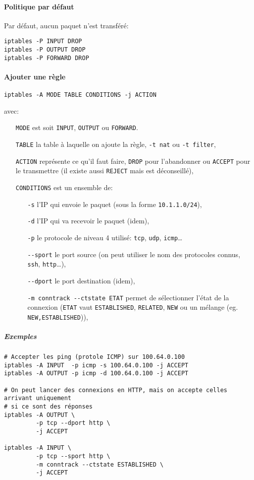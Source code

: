 \documentclass[10pt,a4paper,french]{article}
\begin{document}
\paragraph{Politique par défaut}
Par défaut, aucun paquet n'est transféré:
\begin{verbatim}
iptables -P INPUT DROP
iptables -P OUTPUT DROP
iptables -P FORWARD DROP
\end{verbatim}

\paragraph{Ajouter une règle}
\begin{verbatim}
iptables -A MODE TABLE CONDITIONS -j ACTION
\end{verbatim}
avec:
\begin{itemize}
\item[\tt MODE] est soit {\tt INPUT}, {\tt OUTPUT} ou {\tt FORWARD}.
\item[\tt TABLE] la table à laquelle on ajoute la règle, {\tt -t nat} ou {\tt -t filter},
\item[\tt ACTION] représente ce qu'il faut faire, {\tt DROP} pour l'abandonner ou {\tt ACCEPT} pour le transmettre (il existe aussi {\tt REJECT} mais est déconseillé),
\item[\tt CONDITIONS] est un ensemble de:
\begin{itemize}
\item[\tt -s] l'IP qui envoie le paquet (sous la forme {\tt 10.1.1.0/24}),
\item[\tt -d] l'IP qui va recevoir le paquet (idem),
\item[\tt -p] le protocole de niveau 4 utilisé: {\tt tcp}, {\tt udp}, {\tt icmp}\ldots
\item[\tt -{}-sport] le port source (on peut utiliser le nom des protocoles connus, {\tt ssh}, {\tt http}\ldots),
\item[\tt -{}-dport] le port destination (idem),
\item[\tt -m conntrack -{}-ctstate ETAT] permet de sélectionner l'état de la connexion ({\tt ETAT} vaut {\tt ESTABLISHED}, {\tt RELATED}, {\tt NEW} ou un mélange (eg. {\tt NEW,ESTABLISHED})),
\end{itemize}
\end{itemize}
\subparagraph{Exemples}
\begin{verbatim}
# Accepter les ping (protole ICMP) sur 100.64.0.100
iptables -A INPUT  -p icmp -s 100.64.0.100 -j ACCEPT
iptables -A OUTPUT -p icmp -d 100.64.0.100 -j ACCEPT

# On peut lancer des connexions en HTTP, mais on accepte celles arrivant uniquement
# si ce sont des réponses
iptables -A OUTPUT \
         -p tcp --dport http \
         -j ACCEPT

iptables -A INPUT \
         -p tcp --sport http \
         -m conntrack --ctstate ESTABLISHED \
         -j ACCEPT
\end{verbatim}
\end{document}
